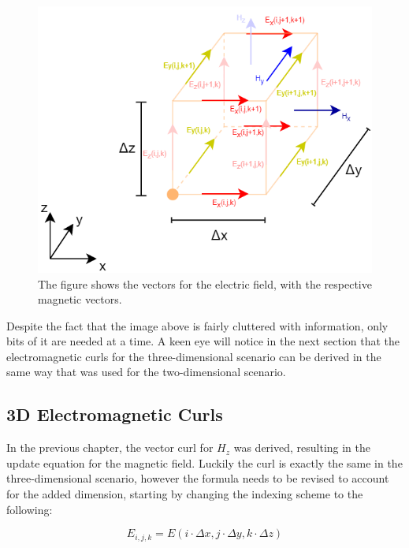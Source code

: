 \begin{figure}[h!]
	\centering
	\includegraphics[scale=0.6]{Figures/fdtd3dFull}
	\decoRule
	\caption[3D Electric Discretization]{The figure shows the vectors for the electric field, with the respective magnetic vectors.}
	\label{fig:fdtd3dFull}
\end{figure}

Despite the fact that the image above is fairly cluttered with information, only bits of it are needed at a time. A keen eye will notice in the next section that the electromagnetic curls for the three-dimensional scenario can be derived in the same way that was used for the two-dimensional scenario.

\subsection{3D Electromagnetic Curls}

In the previous chapter, the vector curl for $H_z$ was derived, resulting in the update equation for the magnetic field. Luckily the curl is exactly the same in the three-dimensional scenario, however the formula needs to be revised to account for the added dimension, starting by changing the indexing scheme to the following:

\begin{equation}
	\label{eqn:indexing3DElectric}
	E_{i,j,k} = E(i \cdot \Delta x , j \cdot \Delta y, k \cdot \Delta z)
\end{equation}

